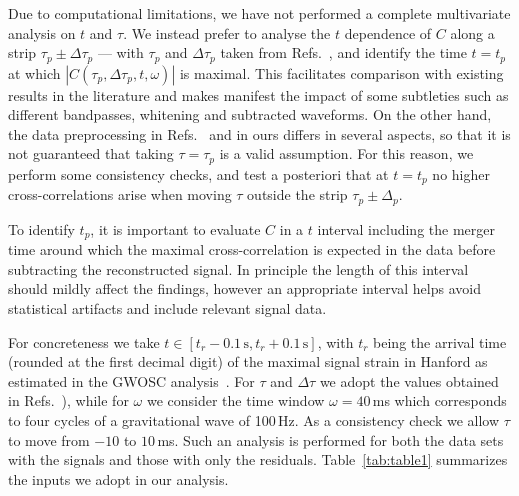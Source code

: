 \documentclass[a4paper,11pt]{article}
\begin{document}
Due to computational limitations, we have not performed a complete multivariate analysis on $t$ and $\tau$. We instead prefer to analyse the $t$ dependence of $C$ along a strip $\tau_p \pm \Delta \tau_p$ --- with $\tau_p$ and $\Delta \tau_p$ taken from Refs.~\cite{Creswell:2017rbh,   TheLIGOScientific:2016pea}, and identify the time $t=t_p$ at which $|C(\tau_p, \Delta \tau_p, t, \omega)|$ is maximal. This facilitates comparison with existing results in the literature and makes manifest the impact of some subtleties such as different bandpasses, whitening and subtracted waveforms. On the other hand, the data preprocessing in Refs.~\cite{Creswell:2017rbh, Nielsen:2018bhc} and in ours differs in several aspects, so that it is not guaranteed that taking $\tau = \tau_p$ is a valid assumption. For this reason, we perform some consistency checks, and test a posteriori that at $t=t_p$ no higher cross-correlations arise when moving $\tau$ outside the strip $\tau_p\pm \Delta_p$. 

 

To identify $t_p$, it is important to evaluate $C$ in a $t$ interval including the merger time around which the maximal cross-correlation is expected in the data before subtracting the reconstructed signal. In principle the length of this interval should mildly affect the findings, however an appropriate interval helps avoid statistical artifacts and include relevant signal data.

For concreteness we take $t\in [t_r - 0.1\, \textrm{s},t_r +0.1\, \textrm{s}]$, with $t_r$ being the arrival time (rounded at the first decimal digit) of the maximal signal strain in Hanford as estimated in the GWOSC analysis~\cite{Vallisneri:2014vxa}. 
For $\tau$ and $\Delta \tau$ we adopt the values obtained in Refs.~\cite{Creswell:2017rbh, TheLIGOScientific:2016pea}), while for $\omega$ we consider the time window $\omega= 40$\,ms which corresponds to four cycles of a gravitational wave of 100\,Hz. As a consistency check we allow $\tau$  to move from $-10$ to $10$\,ms. Such an analysis is performed for both the data sets with the signals and those with only the residuals.
Table~\ref{tab:table1} summarizes the inputs we adopt in our analysis.
\end{document}
